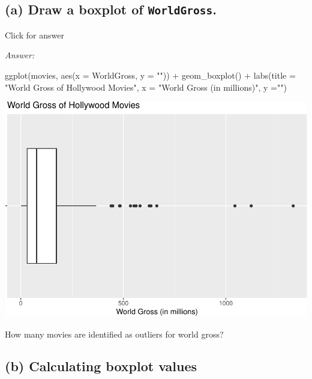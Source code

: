 \documentclass[
]{book}
\newenvironment{Shaded}{\begin{snugshade}}{\end{snugshade}}
\newcommand{\AttributeTok}[1]{\textcolor[rgb]{0.77,0.63,0.00}{#1}}
\newcommand{\FunctionTok}[1]{\textcolor[rgb]{0.00,0.00,0.00}{#1}}
\newcommand{\NormalTok}[1]{#1}
\newcommand{\SpecialCharTok}[1]{\textcolor[rgb]{0.00,0.00,0.00}{#1}}
\newcommand{\StringTok}[1]{\textcolor[rgb]{0.31,0.60,0.02}{#1}}
\begin{document}
\hypertarget{a-draw-a-boxplot-of-worldgross.}{%
\subsection{\texorpdfstring{(a) Draw a boxplot of \texttt{WorldGross}.}{(a) Draw a boxplot of WorldGross.}}\label{a-draw-a-boxplot-of-worldgross.}}

Click for answer

\emph{Answer:}

\begin{Shaded}
\begin{Highlighting}[]
\FunctionTok{ggplot}\NormalTok{(movies, }\FunctionTok{aes}\NormalTok{(}\AttributeTok{x =}\NormalTok{ WorldGross, }\AttributeTok{y =} \StringTok{""}\NormalTok{)) }\SpecialCharTok{+}
  \FunctionTok{geom\_boxplot}\NormalTok{() }\SpecialCharTok{+}
  \FunctionTok{labs}\NormalTok{(}\AttributeTok{title =} \StringTok{"World Gross of Hollywood Movies"}\NormalTok{, }\AttributeTok{x =} \StringTok{"World Gross (in millions)"}\NormalTok{, }\AttributeTok{y =}\StringTok{""}\NormalTok{) }
\end{Highlighting}
\end{Shaded}

\includegraphics[width=1\linewidth]{Class_Activity_5_files/figure-latex/unnamed-chunk-11-1}

How many movies are identified as outliers for world gross?

\hypertarget{b-calculating-boxplot-values}{%
\subsection{(b) Calculating boxplot values}\label{b-calculating-boxplot-values}}
\end{document}
